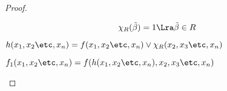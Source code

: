 \documentclass[unicode,10pt]{article}
\begin{document}
\begin{proof}
\begin{itemize}
\begin{itemize}
\begin{itemize}
\begin{denote}
                \begin{displaymath}
                  \chi_R(\tilde\beta)=1 \Lra \tilde\beta\in R
                \end{displaymath}
              \end{denote}
              \begin{denote}
                \begin{math}
                  h(\set[x]{n})=f(\set[x]{n})\vee\chi_R(\setf[x]{n})
                \end{math}
              \end{denote}
              \begin{denote}
                \begin{math}
                  f_1(\set[x]{n})=f(h(\set[x]{n}),\setf[x]{n})
                \end{math}
              \end{denote}

\end{itemize}
\end{itemize}
\end{itemize}
\end{proof}
\end{document}
